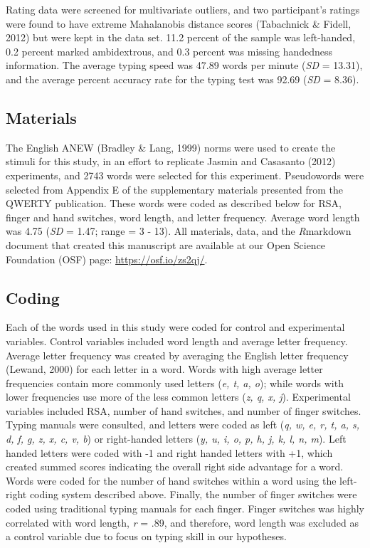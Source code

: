 \documentclass[english,man]{apa6}
\theoremstyle{definition}
\theoremstyle{definition}
\theoremstyle{definition}
\theoremstyle{remark}
\begin{document}
Rating data were screened for multivariate outliers, and two
participant's ratings were found to have extreme Mahalanobis distance
scores (Tabachnick \& Fidell, 2012) but were kept in the data set. 11.2
percent of the sample was left-handed, 0.2 percent marked ambidextrous,
and 0.3 percent was missing handedness information. The average typing
speed was 47.89 words per minute (\emph{SD} = 13.31), and the average
percent accuracy rate for the typing test was 92.69 (\emph{SD} = 8.36).

\subsection{Materials}\label{materials}

The English ANEW (Bradley \& Lang, 1999) norms were used to create the
stimuli for this study, in an effort to replicate Jasmin and Casasanto
(2012) experiments, and 2743 words were selected for this experiment.
Pseudowords were selected from Appendix E of the supplementary materials
presented from the QWERTY publication. These words were coded as
described below for RSA, finger and hand switches, word length, and
letter frequency. Average word length was 4.75 (\emph{SD} = 1.47; range
= 3 - 13). All materials, data, and the \emph{R}markdown document that
created this manuscript are available at our Open Science Foundation
(OSF) page: \url{https://osf.io/zs2qj/}.

\subsection{Coding}\label{coding}

Each of the words used in this study were coded for control and
experimental variables. Control variables included word length and
average letter frequency. Average letter frequency was created by
averaging the English letter frequency (Lewand, 2000) for each letter in
a word. Words with high average letter frequencies contain more commonly
used letters (\emph{e, t, a, o}); while words with lower frequencies use
more of the less common letters (\emph{z, q, x, j}). Experimental
variables included RSA, number of hand switches, and number of finger
switches. Typing manuals were consulted, and letters were coded as left
(\emph{q, w, e, r, t, a, s, d, f, g, z, x, c, v, b}) or right-handed
letters (\emph{y, u, i, o, p, h, j, k, l, n, m}). Left handed letters
were coded with -1 and right handed letters with +1, which created
summed scores indicating the overall right side advantage for a word.
Words were coded for the number of hand switches within a word using the
left-right coding system described above. Finally, the number of finger
switches were coded using traditional typing manuals for each finger.
Finger switches was highly correlated with word length, \emph{r} = .89,
and therefore, word length was excluded as a control variable due to
focus on typing skill in our hypotheses.
\end{document}
